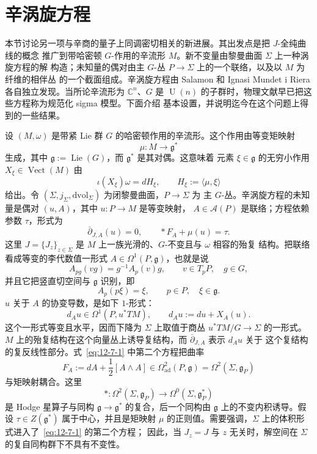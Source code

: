
\section{辛涡旋方程}\label{sec:12-7}

本节讨论另一项与辛商的量子上同调密切相关的新进展。其出发点是把 $J$-全纯曲线的概念
推广到带哈密顿 $G$-作用的辛流形 $M$。新不变量由黎曼曲面 $\Sigma$ 上一种涡旋方程的解
构造；未知量的偶对由主 $G$-丛 $P\to\Sigma$ 上的一个联络，以及以 $M$ 为纤维的相伴丛
的一个截面组成。辛涡旋方程由 Salamon  和 Ignasi Mundet i Riera
 各自独立发现。当所论辛流形为 $\mathbb C^n$、$G$ 是
$\operatorname{U}(n)$ 的子群时，物理文献早已把这些方程称为规范化 sigma 模型。下面介绍
基本设置，并说明迄今在这个问题上得到的一些结果。

设 $(M,\omega)$ 是带紧 Lie 群 $G$ 的哈密顿作用的辛流形。这个作用由等变矩映射
\[
  \mu:M\longrightarrow\mathfrak g^*
\]
生成，其中 $\mathfrak g:=\operatorname{Lie}(G)$，而 $\mathfrak g^*$ 是其对偶。这意味着
元素 $\xi\in\mathfrak g$ 的无穷小作用 $X_\xi\in\operatorname{Vect}(M)$ 由
\[
  \iota(X_\xi)\omega=dH_\xi,
  \qquad H_\xi:=\langle\mu,\xi\rangle
\]
给出。令 $(\Sigma,j_\Sigma,\mathrm{dvol}_\Sigma)$ 为闭黎曼曲面，$P\to\Sigma$ 为
主 $G$-丛。辛涡旋方程的未知量是偶对 $(u,A)$，其中 $u:P\to M$ 是等变映射，
$A\in\mathcal A(P)$ 是联络；方程依赖参数 $\tau$，形式为
\begin{equation}\label{eq:12-7-1}
  \overline\partial_{J,A}(u)=0,
  \qquad *F_A+\mu(u)=\tau.
\end{equation}
这里 $J=\{J_z\}_{z\in\Sigma}$ 是 $M$ 上一族光滑的、$G$-不变且与 $\omega$ 相容的殆复
结构。把联络看成等变的李代数值一形式 $A\in\Omega^1(P,\mathfrak g)$，也就是说
\[
  A_{pg}(vg)=g^{-1}A_p(v)g,
  \qquad v\in T_pP,\quad g\in G,
\]
并且它把竖直切空间与 $\mathfrak g$ 识别，即
\[
  A_p(p\xi)=\xi,
  \qquad p\in P,\quad \xi\in\mathfrak g.
\]
$u$ 关于 $A$ 的协变导数，是如下 $1$-形式：
\[
  d_Au\in\Omega^1(P,u^*TM),
  \qquad d_Au:=du+X_A(u).
\]
这个一形式等变且水平，因而下降为 $\Sigma$ 上取值于商丛 $u^*TM/G\to\Sigma$ 的一形式。
$M$ 上的殆复结构在这个向量丛上诱导复结构，而 $\overline\partial_{J,A}$ 表示 $d_Au$ 关于
这个复结构的复反线性部分。式~\eqref{eq:12-7-1} 中第二个方程把曲率
\[
  F_A:=dA+\frac12[A\wedge A]
  \in\Omega^2_{\mathrm{ad}}(P,\mathfrak g)
  =\Omega^2(\Sigma,\mathfrak g_P)
\]
与矩映射耦合。这里
\[
  *:\Omega^2(\Sigma,\mathfrak g_P)
  \longrightarrow\Omega^0(\Sigma,\mathfrak g_P^*)
\]
是 Hodge 星算子与同构 $\mathfrak g\to\mathfrak g^*$ 的复合，后一个同构由
$\mathfrak g$ 上的不变内积诱导。假设 $\tau\in Z(\mathfrak g^*)$ 属于中心，并且是矩映射
$\mu$ 的正则值。需要强调，$\Sigma$ 上的体积形式进入了~\eqref{eq:12-7-1} 的第二个方程；
因此，当 $J_z=J$ 与 $z$ 无关时，解空间在 $\Sigma$ 的复自同构群下不具有不变性。

